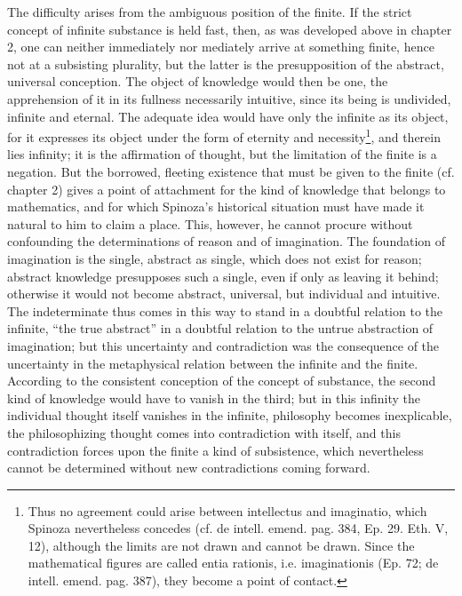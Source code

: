 \documentclass[12pt,a4paper,openany]{book}
\newcommand{\opage}[1]{\marginnote{\footnotesize\textit{[#1]}}}
\begin{document}
The difficulty arises from the ambiguous position of the finite.
If the strict concept of infinite substance is held fast, then, as
was developed above in chapter 2, one can neither immediately nor mediately
arrive at something finite, hence not at a subsisting plurality, but
the latter is the presupposition of the abstract, universal conception.
The object of knowledge would then be one, the apprehension of it in its
\opage{104}\setcounter{footnote}{0}fullness necessarily intuitive, since its being is undivided, infinite and
eternal. The adequate idea would have only the infinite as its object,
for it expresses its object under the form of eternity and necessity\footnote{Thus no agreement could arise
between intellectus and imaginatio, which Spinoza nevertheless concedes
(cf. de intell. emend. pag. 384, Ep. 29. Eth. V, 12), although
the limits are not drawn and cannot be drawn. Since the mathematical
figures are called entia rationis, i.e. imaginationis (Ep. 72; de intell.
emend. pag. 387), they become a point of contact.}, and therein lies
infinity; it is the affirmation of thought, but the limitation of the finite
is a negation. But the borrowed, fleeting existence that
must be given to the finite (cf. chapter 2) gives a point of attachment for the
kind of knowledge that belongs to mathematics, and for which Spinoza's
historical situation must have made it natural to him to claim a place.
This, however, he cannot procure without confounding
the determinations of reason and of imagination. The foundation of imagination
is the single, abstract as single, which does not exist for
reason; abstract knowledge presupposes such a single,
even if only as leaving it behind; otherwise it would not become abstract,
universal, but individual and intuitive. The indeterminate thus comes
in this way to stand in a doubtful relation to the infinite,
``the true abstract'' in a doubtful relation to the untrue abstraction of
imagination; but this uncertainty and contradiction was
the consequence of the uncertainty in the metaphysical relation between the
infinite and the finite. According to the consistent conception of
the concept of substance, the second kind of knowledge would have to vanish in the
third; but in this infinity the individual thought itself
vanishes in the infinite, philosophy becomes inexplicable, the
philosophizing thought comes into contradiction with itself, and this
contradiction forces upon the finite a kind of subsistence, which nevertheless cannot
be determined without new contradictions coming forward.
\end{document}
